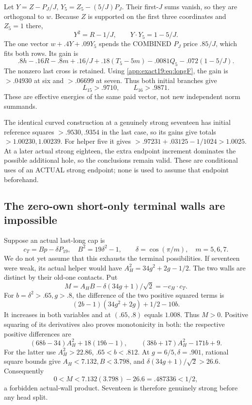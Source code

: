 Let \(Y=Z-P_J/J\),
\(Y_5=Z_5-(5/J)P_J\).
Their first-\(J\) sums vanish,
so they are orthogonal to \(w\).
Because \(Z\) is supported on the
first three coordinates and
\(Z_5=1\) there,
\[
             Y^2=R-1/J,\qquad Y\cdot Y_5=1-5/J .
\]
The one vector \(w+.4Y+.09Y_5\)
spends the COMBINED
\(P_J\) price \(.85/J\), which
fits both rows.
Its gain is
\[
 .8h-.16R-.8m+.16/J
 +.18(T_5-5m)-.0081Q_5-.072(1-5/J).
\]
The nonzero last cross is retained.
Using \eqref{app:exact19:eq:longF},
the gain is \(>.04930\) at six
and \(>.06699\) at seven.
Thus both initial branches give
\[
                         L_{15}>.9710,\qquad L_{16}>.9871 .
\]
These are effective energies of
the same paid vector, not new
independent norm summands.

The identical curved construction
at a genuinely strong seventeen
has initial reference squares
\(>.9530,.9354\) in the last case,
so its gains give totals
\(>1.00230,1.00239\).
For helper five it gives
\(>.97231+.03125-1/1024>1.0025\).
At a later actual strong eighteen,
the extra endpoint increment
dominates the possible additional
hole, so the conclusions remain
valid.
These are conditional uses of
an ACTUAL strong endpoint;
none is used to assume that
endpoint beforehand.


\subsection{The zero-own short-only terminal walls are impossible}
\label{app:exact19:Bzeroown}

Suppose an actual last-long cap is
\[
 c_T=Bp-\delta P_{19},\quad B^2=19\delta^2-1,\qquad
                 \delta=\cos(\pi/m),\quad m=5,6,7 .
\]
We do not yet assume that this
exhausts the terminal possibilities.
If seventeen were weak, its actual
helper would have
\(A_H^2=34g^2+2g-1/2\).
The two walls are distinct by their
old-one contacts.
Put
\[
 M=A_HB-\delta(34g+1)/\sqrt2=-c_H\cdot c_T .
\]
For \(b=\delta^2>.65,g>.8\), the
difference of the two positive
squared terms is
\[
                 (2b-1)(34g^2+2g)+1/2-10b .
\]
It increases in both variables
and at \((.65,.8)\) equals \(1.008\).
Thus \(M>0\).
Positive squaring of its derivatives
also proves monotonicity in both:
the respective positive differences
are
\[
 (68b-34)A_H^2+18(19b-1),\qquad
                 (38b+17)A_H^2-171b+9 .
\]
For the latter use \(A_H^2>22.86\),
\(.65<b<.812\).
At \(g=6/5,\delta=.901\), rational
square bounds give
\(A_H<7.132,B<3.798\), and
\(\delta(34g+1)/\sqrt2>26.6\).
Consequently
\[
                     0<M<7.132(3.798)-26.6
                             =.487336<1/2 ,
\]
a forbidden actual-wall product.
Seventeen is therefore genuinely
strong before any head split.

